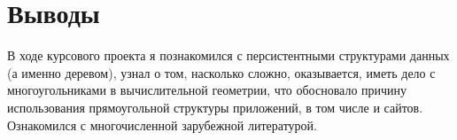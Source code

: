 
\section{Выводы}
В ходе курсового проекта я познакомился с персистентными структурами данных (а именно деревом), узнал о том, насколько сложно, оказывается, иметь дело с многоугольниками в вычислительной геометрии, что обосновало причину использования прямоугольной структуры приложений, в том числе и сайтов. Ознакомился с многочисленной зарубежной литературой.
\pagebreak
